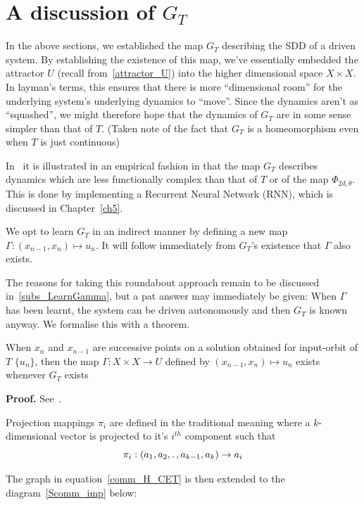 \section{A discussion of $G_T$ }

In the above sections, we established the map $G_T$ describing the SDD of a driven system. By establishing the existence of this map, we’ve essentially embedded the attractor $U$ (recall from~\ref{attractor_U}) into the higher dimensional space $X\times{X}$.
In layman’s terms, this ensures that there is more “dimensional room” for the underlying system’s underlying dynamics to “move”. Since the dynamics aren’t as “squashed”, we might therefore hope that the dynamics of $G_T$ are in some sense simpler than that of $T$. (Taken note of the fact that $G_T$ is a homeomorphism even when $T$ is just continuous)
 
In~\cite{manjunath2021universal} it is illustrated in an empirical fashion in that the map $G_T$ describes dynamics which are less functionally complex than that of $T$ or of the map $\Phi_{2d,\theta}$. This is done by implementing a Recurrent Neural Network (RNN), which is discussed in Chapter~\ref{ch5}. 
 
We opt to learn $G_T$ in an indirect manner by defining a new map $\Gamma:(x_{n-1},x_n)\mapsto{u_n}$. It will follow immediately from $G_T$’s existence that $\Gamma$ also exists. 

The reasons for taking this roundabout approach remain to be discussed in~\ref{subs_LearnGamma}, but a pat answer may immediately be given: When $\Gamma$ has been learnt, the system can be driven autonomously and then $G_T$ is known anyway. We formalise this with a theorem.

\begin{Theorem}
  When $x_n$ and $x_{n-1}$ are successive points on a solution obtained for input-orbit of $T$ $\{u_n\}$, then the map $\Gamma: X\times{X}\to{U}$ defined by $(x_{n-1},x_n)\mapsto{u_n}$ exists whenever $G_T$ exists 
\end{Theorem}
\vspace{-6mm}
{\bf Proof.}  See~\cite[Th. 3c]{manjunath2021universal}.

Projection mappings $\pi_i$ are defined in the traditional meaning where a $k$-dimensional vector is projected to it's $i^{th}$ component such that \[\pi_i:(a_1,a_2, \ldotp, a_{k-1}, a_k)\to{a_i}\]

The graph in equation~\ref{comm_H_CET} is then extended to the diagram~\ref{Scomm_imp} below:

